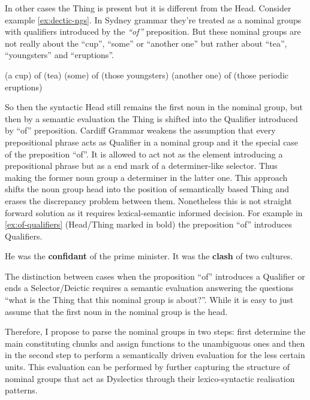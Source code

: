 		In other cases the Thing is present but it is different from the Head. Consider example \ref{ex:dectic-ngs}. In Sydney grammar they're treated as a nominal groups with qualifiers introduced by the \textit{``of''} preposition. But these nominal groups are not really about the ``cup'', ``some'' or ``another one'' but rather about ``tea'', ``youngsters'' and ``eruptions''. 
		\begin{exe}
			\ex \label{ex:dectic-ngs} (a cup) of (tea)
			\ex (some) of (those youngsters)
			\ex (another one) of (those periodic eruptions)
		\end{exe}
		So then the syntactic Head still remains the first noun in the nominal group, but then by a semantic evaluation the Thing is shifted into the Qualifier introduced by ``of'' preposition. Cardiff Grammar weakens the assumption that every prepositional phrase acts as Qualifier in a nominal group and it the special case of the preposition ``of''. It is allowed to act not as the element introducing a prepositional phrase but as a end mark of a determiner-like selector. Thus making the former noun group a determiner in the latter one. This approach shifts the noun group head into the position of semantically based Thing and erases the discrepancy problem between them. Nonetheless this is not straight forward solution as it requires lexical-semantic informed decision.
        For example in \ref{ex:of-qualifiers} (Head/Thing marked in bold) the preposition ``of'' introduces Qualifiers. 
		\begin{exe}
			\ex \label{ex:of-qualifiers}
			He was the \textbf{confidant} of the prime minister.
			\ex It was the \textbf{clash} of two cultures.
		\end{exe}
		
		The distinction between cases when the proposition ``of'' introduces a Qualifier or ends a Selector/Deictic requires a semantic evaluation answering the questions ``what is the Thing that this nominal group is about?''. While it is easy to just assume that the first noun in the nominal group is the head. 
        
        Therefore, I propose to parse the nominal groups in two steps: first determine the main constituting chunks and assign functions to the unambiguous ones and then in the second step to perform a semantically driven evaluation for the less certain units. This evaluation can be performed by further capturing the structure of nominal groups that act as Dyslectics through their lexico-syntactic realisation patterns.
	

